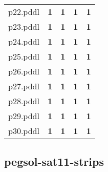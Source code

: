\documentclass{article}
\begin{document}
\begin{tabular}{@{}lrrrr@{}}
p22.pddl & \textbf{1} & \textbf{1} & \textbf{1} & \textbf{1} \\
p23.pddl & \textbf{1} & \textbf{1} & \textbf{1} & \textbf{1} \\
p24.pddl & \textbf{1} & \textbf{1} & \textbf{1} & \textbf{1} \\
p25.pddl & \textbf{1} & \textbf{1} & \textbf{1} & \textbf{1} \\
p26.pddl & \textbf{1} & \textbf{1} & \textbf{1} & \textbf{1} \\
p27.pddl & \textbf{1} & \textbf{1} & \textbf{1} & \textbf{1} \\
p28.pddl & \textbf{1} & \textbf{1} & \textbf{1} & \textbf{1} \\
p29.pddl & \textbf{1} & \textbf{1} & \textbf{1} & \textbf{1} \\
p30.pddl & \textbf{1} & \textbf{1} & \textbf{1} & \textbf{1} \\
\end{tabular}

\hypertarget{coverage-pegsol-sat11-strips}{}
\subsection*{pegsol-sat11-strips}
\end{document}
